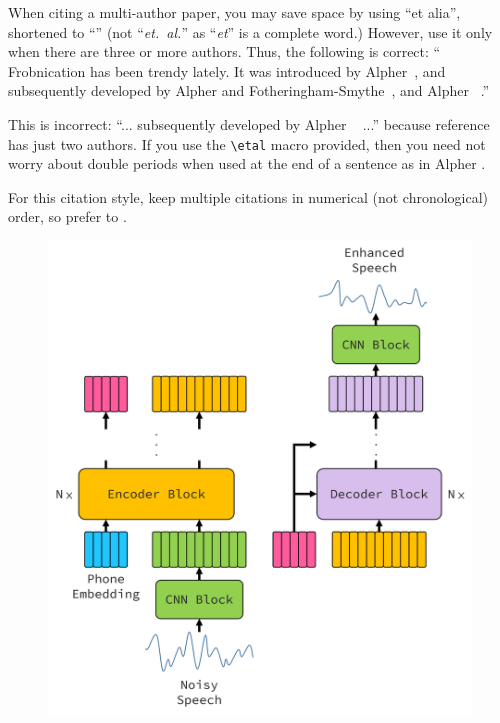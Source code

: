 \documentclass[10pt,twocolumn,letterpaper]{article}
\begin{document}
\begin{CJK}{UTF8}{bkai}
   When citing a multi-author paper, you may save space by using ``et alia'',
   shortened to ``\etal'' (not ``{\em et.\ al.}'' as ``{\em et}'' is a complete word.)
   However, use it only when there are three or more authors.  Thus, the
   following is correct: ``
   Frobnication has been trendy lately.
   It was introduced by Alpher~\cite{Alpher02}, and subsequently developed by
   Alpher and Fotheringham-Smythe~\cite{Alpher03}, and Alpher \etal~\cite{Alpher04}.''

   This is incorrect: ``... subsequently developed by Alpher \etal~\cite{Alpher03} ...''
   because reference~\cite{Alpher03} has just two authors.  If you use the
   \verb'\etal' macro provided, then you need not worry about double periods
   when used at the end of a sentence as in Alpher \etal.

   For this citation style, keep multiple citations in numerical (not
   chronological) order, so prefer \cite{Alpher03,Alpher02,Authors14} to
   \cite{Alpher02,Alpher03,Authors14}.


   \begin{figure}
      \begin{center}
         \includegraphics[scale=0.35]{img/architecture.png}


\end{center}
\end{figure}
\end{CJK}
\end{document}
